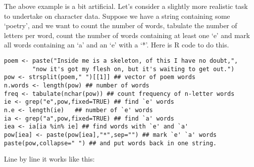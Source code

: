 \documentclass[10pt] {article}
\theoremstyle{definition}
\begin{document}
The above example is a bit artificial. Let's consider a slightly more realistic task to undertake on character data. Suppose we have a string containing  some `poetry', and we want to count the number of words, tabulate the number of letters per word, count the number of words containing at least one `e' and mark all words containing an `a' and an `e' with a `*'. Here is R code to do this.
\begin{lstlisting}
poem <- paste("Inside me is a skeleton, of this I have no doubt,",
        "now it's got my flesh on, but it's waiting to get out.")
pow <- strsplit(poem," ")[[1]] ## vector of poem words
n.words <- length(pow) ## number of words
freq <- tabulate(nchar(pow)) ## count frequency of n-letter words
ie <- grep("e",pow,fixed=TRUE) ## find `e' words
n.e <- length(ie)   ## number of `e' words
ia <- grep("a",pow,fixed=TRUE) ## find `a' words
iea <- ia[ia %in% ie] ## find words with `e' and `a'
pow[iea] <- paste(pow[iea],"*",sep="") ## mark `e' `a' words
paste(pow,collapse=" ") ## and put words back in one string.
\end{lstlisting}
Line by line it works like this:
\end{document}
